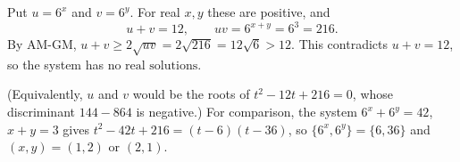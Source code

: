 Put $u=6^x$ and $v=6^y$. For real $x,y$ these are positive, and
\[
u+v=12,\qquad uv=6^{x+y}=6^3=216 .
\]
By AM-GM, $u+v\ge2\sqrt{uv}=2\sqrt{216}=12\sqrt6>12$. This contradicts $u+v=12$, so the system has $\boxed{\text{no real solutions}}$.

(Equivalently, $u$ and $v$ would be the roots of $t^2-12t+216=0$, whose discriminant $144-864$ is negative.) For comparison, the system $6^x+6^y=42$, $x+y=3$ gives $t^2-42t+216=(t-6)(t-36)$, so $\{6^x,6^y\}=\{6,36\}$ and $(x,y)=(1,2)$ or $(2,1)$.
